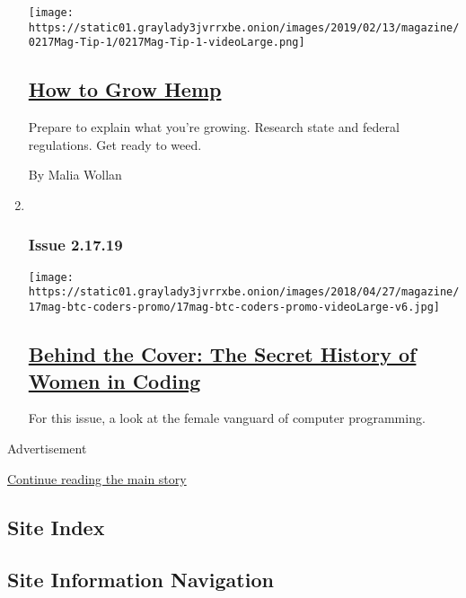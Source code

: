 \begin{enumerate}
  \texttt{[image: https://static01.graylady3jvrrxbe.onion/images/2019/02/13/magazine/0217Mag-Tip-1/0217Mag-Tip-1-videoLarge.png]}

  \hypertarget{how-to-grow-hemp}{%
  \subsection{\texorpdfstring{\href{/2019/02/14/magazine/how-to-grow-hemp.html}{How
  to Grow Hemp}}{How to Grow Hemp}}\label{how-to-grow-hemp}}

  Prepare to explain what you're growing. Research state and federal
  regulations. Get ready to weed.

  By Malia Wollan
\item ~
  \hypertarget{issue-21719}{%
  \subsubsection{Issue 2.17.19}\label{issue-21719}}

  \texttt{[image: https://static01.graylady3jvrrxbe.onion/images/2018/04/27/magazine/17mag-btc-coders-promo/17mag-btc-coders-promo-videoLarge-v6.jpg]}

  \hypertarget{behind-the-cover-the-secret-history-of-women-in-coding}{%
  \subsection{\texorpdfstring{\href{/2019/02/13/magazine/behind-the-cover-the-secret-history-of-women-in-coding.html}{Behind
  the Cover: The Secret History of Women in
  Coding}}{Behind the Cover: The Secret History of Women in Coding}}\label{behind-the-cover-the-secret-history-of-women-in-coding}}

  For this issue, a look at the female vanguard of computer programming.
\end{enumerate}

Advertisement

\protect\hyperlink{after-mid1}{Continue reading the main story}

\hypertarget{site-index}{%
\subsection{Site Index}\label{site-index}}

\hypertarget{site-information-navigation}{%
\subsection{Site Information
Navigation}\label{site-information-navigation}}

